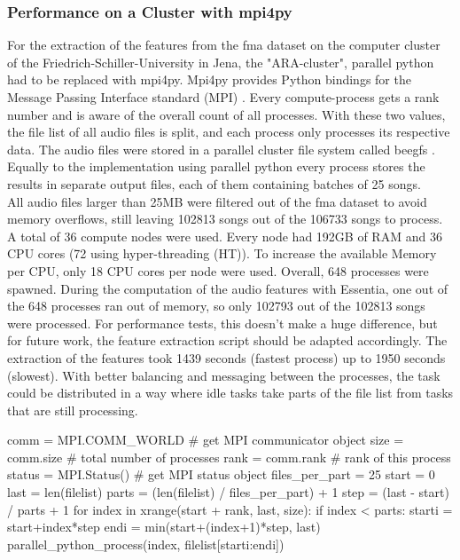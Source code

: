 \subsubsection{Performance on a Cluster with mpi4py}

For the extraction of the features from the fma dataset on the computer cluster of the Friedrich-Schiller-University in Jena, the "ARA-cluster", parallel python had to be replaced with mpi4py. 
Mpi4py provides Python bindings for the Message Passing Interface standard (MPI) \cite{mpi4py}. 
Every compute-process gets a rank number and is aware of the overall count of all processes. With these two values, the file list of all audio files is split, and each process only processes its respective data. The audio files were stored in a parallel cluster file system called beegfs \cite{beegfs}. Equally to the implementation using parallel python every process stores the results in separate output files, each of them containing batches of 25 songs.\\
All audio files larger than 25MB were filtered out of the fma dataset to avoid memory overflows, still leaving 102813 songs out of the 106733 songs to process. A total of 36 compute nodes were used. Every node had 192GB of RAM and 36 CPU cores (72 using hyper-threading (HT)). To increase the available Memory per CPU, only 18 CPU cores per node were used. Overall, 648 processes were spawned. During the computation of the audio features with Essentia, one out of the 648 processes ran out of memory, so only 102793 out of the 102813 songs were processed. For performance tests, this doesn't make a huge difference, but for future work, the feature extraction script should be adapted accordingly. 
The extraction of the features took 1439 seconds (fastest process) up to 1950 seconds (slowest). With better balancing and messaging between the processes, the task could be distributed in a way where idle tasks take parts of the file list from tasks that are still processing. 

\begin{pythonCode}[frame=single,label={lst:mpi4py},caption={mpi4py},captionpos=b]
comm = MPI.COMM_WORLD   # get MPI communicator object
size = comm.size        # total number of processes
rank = comm.rank        # rank of this process
status = MPI.Status()   # get MPI status object
files_per_part = 25
start = 0
last = len(filelist)
parts = (len(filelist) / files_per_part) + 1
step = (last - start) / parts + 1
for index in xrange(start + rank, last, size):
    if index < parts:        
        starti = start+index*step
        endi = min(start+(index+1)*step, last)
        parallel_python_process(index, filelist[starti:endi])
\end{pythonCode}


